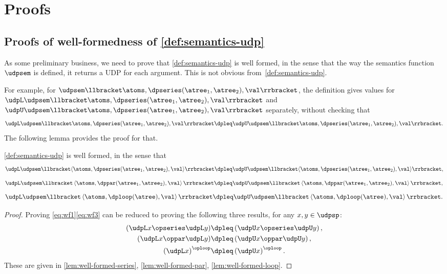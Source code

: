 \section{Proofs}

\subsection{Proofs of well-formedness of \cref{def:semantics-udp}}

As some preliminary business, we need to prove that \cref{def:semantics-udp}
is well formed, in the sense that the way the semantics function~$\udpsem$
is defined, it returns a UDP for each argument. This is not obvious
from~\cref{def:semantics-udp}.

For example, for $\udpsem\llbracket\atoms,\dpseries(\atree_{1},\atree_{2}),\val\rrbracket$,
the definition gives values for~$\udpL\udpsem\llbracket\atoms,\dpseries(\atree_{1},\atree_{2}),\val\rrbracket$
and~$\udpU\udpsem\llbracket\atoms,\dpseries(\atree_{1},\atree_{2}),\val\rrbracket$
separately, without checking that
\[
  \udpL\udpsem\llbracket\atoms,\dpseries(\atree_{1},\atree_{2}),\val\rrbracket\dpleq\udpU\udpsem\llbracket\atoms,\dpseries(\atree_{1},\atree_{2}),\val\rrbracket.
\]
The following lemma provides the proof for that.
\begin{lemma}
  \label{lem:udpsem-well-formed}\cref{def:semantics-udp} is well
  formed, in the sense that {\small{}
    \begin{equation}
      \udpL\udpsem\llbracket\langle\atoms,\dpseries(\atree_{1},\atree_{2}),\val\rangle\rrbracket\dpleq\udpU\udpsem\llbracket\langle\atoms,\dpseries(\atree_{1},\atree_{2}),\val\rangle\rrbracket,\label{eq:wf1}
    \end{equation}
    \begin{equation}
      \udpL\udpsem\llbracket\left\langle \atoms,\dppar(\atree_{1},\atree_{2}),\val\right\rangle \rrbracket\dpleq\udpU\udpsem\llbracket\left\langle \atoms,\dppar(\atree_{1},\atree_{2}),\val\right\rangle \rrbracket,\label{eq:wf2}
    \end{equation}
    \begin{equation}
      \udpL\udpsem\llbracket\left\langle \atoms,\dploop(\atree),\val\right\rangle \rrbracket\dpleq\udpU\udpsem\llbracket\left\langle \atoms,\dploop(\atree),\val\right\rangle \rrbracket.\label{eq:wf3}
    \end{equation}
  }{\small \par}
\end{lemma}
\begin{proof}
  Proving \cref{eq:wf1}\textemdash \cref{eq:wf3} can be
  reduced to proving the following three results, for any $x,y\in\udpsp$:
  \begin{align*}
    \left(\udpL x\opseries\udpL y\right) & \dpleq\left(\udpU x\opseries\udpU y\right),\\
    \left(\udpL x\oppar\udpL y\right) & \dpleq\left(\udpU x\oppar\udpU y\right),\\
    \left(\udpL x\right)^{\oploop} & \dpleq\left(\udpU x\right)^{\oploop}.
  \end{align*}
  These are given in \cref{lem:well-formed-series}, \cref{lem:well-formed-par},
  \cref{lem:well-formed-loop}.
\end{proof}
